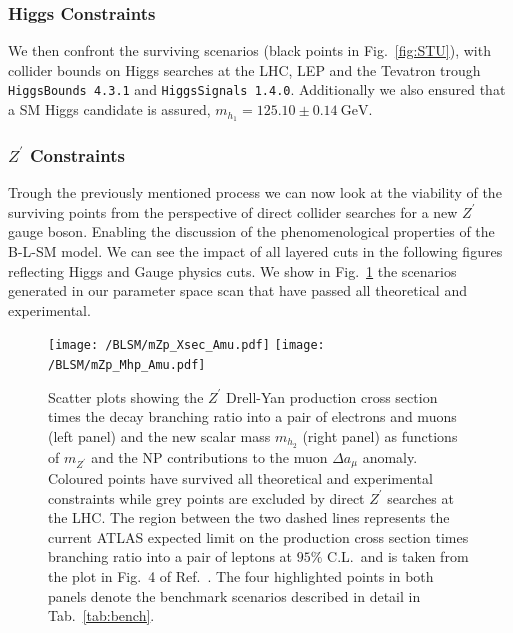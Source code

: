 \documentclass[10pt]{book}
\newcommand{\ro}[1]{\textrm{#1}}
\renewcommand{\(}{\left(}
\renewcommand{\)}{\right)}
\renewcommand{\[}{\left[}
\renewcommand{\]}{\right]}
\begin{document}

\subsubsection{Higgs Constraints}

We then confront the surviving scenarios (black points in Fig.~\ref{fig:STU}), with collider bounds on Higgs searches at the LHC, LEP and the Tevatron trough \texttt{HiggsBounds 4.3.1} and \texttt{HiggsSignals 1.4.0}. 
%
Additionally we also ensured that a SM Higgs candidate is assured, $m_{h_1} = 125.10 \pm 0.14~\textrm{GeV}$. 



\subsubsection{$Z^\prime$ Constraints}

Trough the previously mentioned process we can now look at the viability of the surviving points from the perspective of direct collider searches for a new $Z^\prime$ gauge boson. Enabling the discussion of the phenomenological properties of the B-L-SM model. We can see the impact of all layered cuts in the following figures reflecting Higgs and Gauge physics cuts. We show in Fig.~\ref{fig:Plots1} the scenarios generated in our parameter space scan that have passed all theoretical and experimental.
%
\begin{figure}[H]
	\centering
	\texttt{[image: /BLSM/mZp\_Xsec\_Amu.pdf]}
	\texttt{[image: /BLSM/mZp\_Mhp\_Amu.pdf]}
	\caption{Scatter plots showing the $Z^\prime$ Drell-Yan production cross section times the decay branching ratio into a pair of electrons and muons (left panel) and the new scalar mass $m_{h_2}$ (right panel) as functions of $m_{Z^\prime}$ and the NP contributions to the muon $\Delta a_\mu$ anomaly. Coloured points have survived all theoretical and experimental constraints while grey points are excluded by direct $Z^\prime$ searches at the LHC. The region between the two dashed lines represents the current ATLAS expected limit on the production cross section times branching ratio into a pair of leptons at $95\%$ C.L.~and is taken from the plot in Fig.~4 of Ref.~\cite{Aaboud:2017buh}. The four highlighted points in both panels denote the benchmark scenarios described in detail in Tab.~\ref{tab:bench}.}
	\label{fig:Plots1}
\end{figure}	
\end{document}
